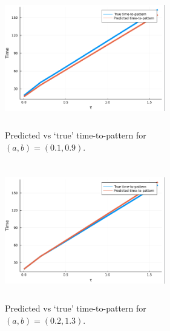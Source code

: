 \begin{figure}[H]
    \centering
    \begin{subfigure}[b]{0.45\textwidth}
        \centering
        \includegraphics[width=7cm,height=6cm]{ttp2.png}
        \caption{Predicted vs `true' time-to-pattern for $(a,b)=(0.1,0.9)$.}
        \label{fig:ttp2}
    \end{subfigure}
    \hfill
    \begin{subfigure}[b]{0.45\textwidth}
        \centering
        \includegraphics[width=7cm,height=6cm]{ttp3.png}
        \caption{Predicted vs `true' time-to-pattern for $(a,b)=(0.2,1.3)$.}
        \label{fig:ttp3}
    \end{subfigure}
    \caption{}
    \label{}
\end{figure}

